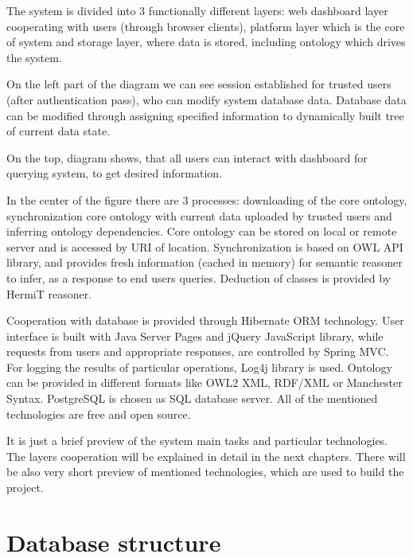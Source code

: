 \newpage

\noindent The system is divided into 3 functionally different layers: web dashboard layer cooperating with users (through browser clients), platform layer which is the core of system and storage layer, where data is stored, including ontology which drives the system. 

On the left part of the diagram we can see session established for trusted users (after authentication pass), who can modify system database data. Database data can be modified through assigning specified information to dynamically built tree of current data state. 

On the top, diagram shows, that all users can interact with dashboard for querying system, to get desired information. 

In the center of the figure there are 3 processes: downloading of the core ontology, synchronization core ontology with current data uploaded by trusted users and inferring ontology dependencies. Core ontology can be stored on local or remote server and is accessed by URI of location. Synchronization is based on OWL API library, and provides fresh information (cached in memory) for semantic reasoner to infer, as a response to end users queries. Deduction of classes is provided by HermiT reasoner. 

Cooperation with database is provided through Hibernate ORM technology. User interface is built with Java Server Pages and jQuery JavaScript library, while requests from users and appropriate responses, are controlled by Spring MVC. For logging the results of particular operations, Log4j library is used. Ontology can be provided in different formats like OWL2 XML, RDF/XML or Manchester Syntax. PostgreSQL is chosen as SQL database server. All of the mentioned technologies are free and open source.

\begin{framed}
\noindent It is just a brief preview of the system main tasks and particular technologies. The layers cooperation will be explained in detail in the next chapters. There will be also very short preview of mentioned technologies, which are used to build the project.
\end{framed}

\newpage

\section{Database structure}
\label{sec:databaseStructure}

